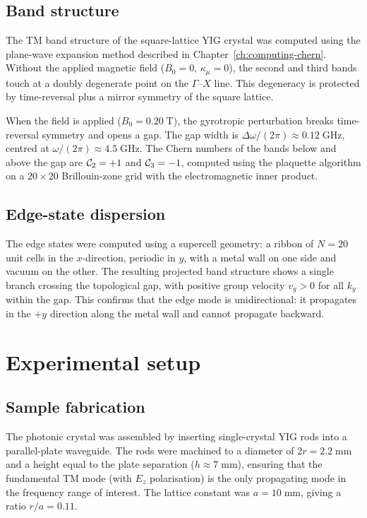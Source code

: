 \subsection{Band structure}
\label{sec:ch9-bands}

The TM band structure of the square-lattice YIG crystal was computed
using the plane-wave expansion method described in
Chapter~\ref{ch:computing-chern}.  Without the applied magnetic field
($B_0=0$, $\kappa_\mu=0$), the second and third bands touch at a
doubly degenerate point on the $\Gamma$--$X$ line.  This degeneracy
is protected by time-reversal plus a mirror symmetry of the square
lattice.

When the field is applied ($B_0=0.20\;\mathrm{T}$), the gyrotropic
perturbation breaks time-reversal symmetry and opens a gap.  The gap
width is $\Delta\omega/(2\pi)\approx 0.12\;\mathrm{GHz}$, centred at
$\omega/(2\pi)\approx 4.5\;\mathrm{GHz}$.  The Chern numbers of the
bands below and above the gap are $\mathcal{C}_2=+1$ and $\mathcal{C}_3=-1$,
computed using the plaquette algorithm on a $20\times 20$ Brillouin-zone
grid with the electromagnetic inner product.

\subsection{Edge-state dispersion}
\label{sec:ch9-edge-dispersion}

The edge states were computed using a supercell geometry: a ribbon of
$N=20$ unit cells in the $x$-direction, periodic in $y$, with a metal
wall on one side and vacuum on the other.  The resulting projected band
structure shows a single branch crossing the topological gap, with
positive group velocity $v_g>0$ for all $k_y$ within the gap.  This
confirms that the edge mode is unidirectional: it propagates in the
$+y$ direction along the metal wall and cannot propagate backward.

\section{Experimental setup}
\label{sec:ch9-setup}

\subsection{Sample fabrication}
\label{sec:ch9-fabrication}

The photonic crystal was assembled by inserting single-crystal YIG rods
into a parallel-plate waveguide.  The rods were machined to a diameter
of $2r=2.2\;\mathrm{mm}$ and a height equal to the plate separation
($h\approx 7\;\mathrm{mm}$), ensuring that the fundamental TM mode
(with $E_z$ polarisation) is the only propagating mode in the frequency
range of interest.  The lattice constant was $a=10\;\mathrm{mm}$,
giving a ratio $r/a=0.11$.

